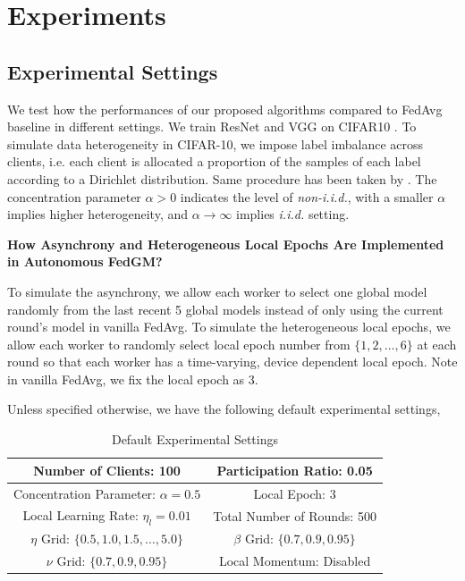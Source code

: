 \section{Experiments}
\label{sec:appendix_exp}

\subsection{Experimental Settings}
\label{subsec:exp_settings_appendix}

We test how the performances of our proposed algorithms compared to FedAvg baseline in different settings. We train ResNet \citep{He2016DeepResNet} and VGG \citep{Simonyan14VGG} on CIFAR10 \citep{Krizhevsky2009CIFAR}. To simulate data heterogeneity in CIFAR-10, we impose label imbalance across clients, i.e. each client is allocated a proportion of the samples of each label according to a Dirichlet distribution. Same procedure has been taken by \citep{Hsu2019MeasuringTE, Yurochkin2019BayesianNF, Wang20FedNova, li2022NIIDBenchmark}. The concentration parameter $\alpha>0$ indicates the level of \textit{non-i.i.d.}, with a smaller $\alpha$ implies higher heterogeneity, and $\alpha\to\infty$ implies \textit{i.i.d.} setting. 

\textbf{How Asynchrony and Heterogeneous Local Epochs Are Implemented in Autonomous FedGM?}

To simulate the asynchrony, we allow each worker to select one global model randomly from the last recent 5 global models instead of only using the current round's model in vanilla FedAvg. To simulate the heterogeneous local epochs, we allow each worker to randomly select local epoch number from $\{1,2, \dots, 6\}$ at each round so that each worker has a time-varying, device dependent local epoch. Note in vanilla FedAvg, we fix the local epoch as 3.

Unless specified otherwise, we have the following default experimental settings,

\begin{table}[htbp]
\vskip -2pt
    \caption{Default Experimental Settings}
    \centering
    \begin{tabular}{c|c}
    \hline
    Number of Clients: 100 & Participation Ratio: 0.05\\ 
    \hline
    Concentration Parameter: $\alpha=0.5$ & Local Epoch: 3\\ 
    \hline
    Local Learning Rate: $\eta_l=0.01$ &  Total Number of Rounds: 500\\ 
    \hline
    $\eta$ Grid: $\{0.5,1.0,1.5,\dots,5.0\}$ & $\beta$ Grid: $\{0.7,0.9,0.95\}$ \\ 
    \hline
    $\nu$ Grid: $\{0.7,0.9,0.95\}$ & Local Momentum: Disabled\\ 
    \hline
    \end{tabular}
    \label{default_setting_table}
\vskip -2pt
\end{table}

